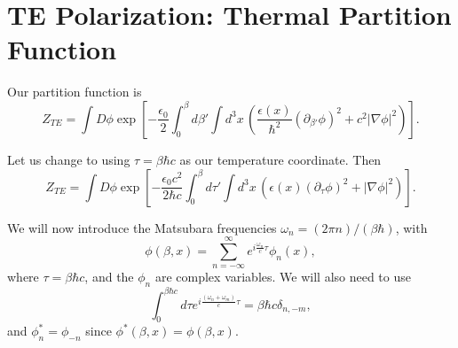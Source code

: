 \section{TE Polarization: Thermal Partition Function}

Our partition function is 
\begin{equation}
Z_{TE} = \int D\phi \exp\left[ -\frac{\epsilon_0}{2}\int_0^\beta d\beta'\int d^3x\, 
\left( \frac{\epsilon(x)}{\hbar^2}(\partial_{\beta'}\phi)^2 + c^2|\nabla\phi|^2\right)\right] .
\end{equation}

Let us change to using $\tau = \beta \hbar c$ as our temperature coordinate.  Then   
\begin{equation}
Z_{TE} = \int D\phi \exp\left[ -\frac{\epsilon_0 c^2 }{2 \hbar c}\int_0^\beta d\tau'\int d^3x\, 
\left( \epsilon(x)(\partial_{\tau}\phi)^2 + |\nabla\phi|^2\right)\right] .
\end{equation}

We will now introduce the Matsubara frequencies $\omega_n = (2\pi n)/(\beta \hbar)$, with 
\begin{equation}
\phi(\beta,x) = \sum_{n=-\infty}^{\infty}e^{i\frac{\omega_n}{c}\tau} \phi_n(x),
\end{equation}
where $\tau = \beta\hbar c$, and the $\phi_n$ are complex variables.  We will also need to use  
\begin{equation}
\int_0^{\beta \hbar c}d\tau e^{i\frac{(\omega_n+\omega_m)}{c}\tau} = \beta\hbar c \delta_{n,-m},
\end{equation}
and $\phi_n^* = \phi_{-n}$ since $\phi^*(\beta, x) = \phi(\beta, x)$.  

